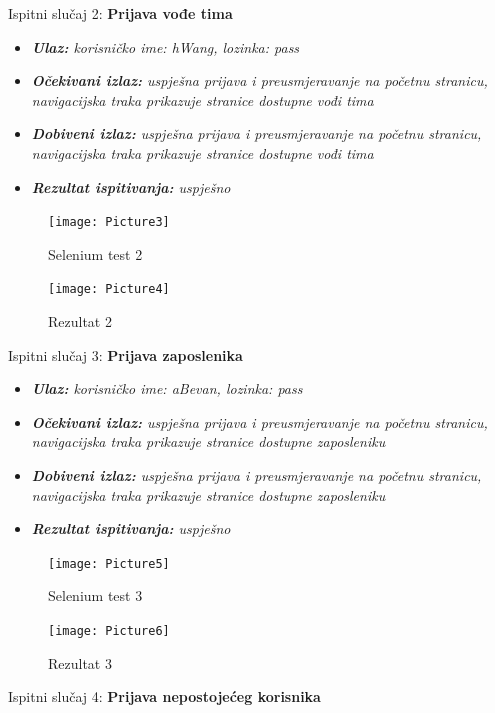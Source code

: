 Ispitni slučaj 2: \textbf{Prijava vođe tima} 


\begin{itemize}
 	\item \textit{ \textbf{Ulaz: }korisničko ime: hWang, lozinka: pass }
 	\item \textit{\textbf{Očekivani izlaz: }uspješna prijava i preusmjeravanje na početnu stranicu, navigacijska traka prikazuje stranice dostupne vođi tima }
 	\item \textit{\textbf{Dobiveni izlaz: }uspješna prijava i preusmjeravanje na početnu stranicu, navigacijska traka prikazuje stranice dostupne vođi tima }
 	\item \textit{\textbf{Rezultat ispitivanja: }uspješno}
 \end{itemize}
                \begin{figure}[H] 					\centering 					                \texttt{[image: Picture3]}
				\caption{Selenium test 2}
				\end{figure}
			    \begin{figure}[H] 					\centering 					\texttt{[image: Picture4]}
				\caption{Rezultat 2}
				\end{figure}
  
Ispitni slučaj 3: \textbf{Prijava zaposlenika } 


\begin{itemize}
 	\item \textit{ \textbf{Ulaz: }korisničko ime: aBevan, lozinka: pass}
 	\item \textit{\textbf{Očekivani izlaz: }uspješna prijava i preusmjeravanje na početnu stranicu, navigacijska traka prikazuje stranice dostupne zaposleniku}
 	\item \textit{\textbf{Dobiveni izlaz: }uspješna prijava i preusmjeravanje na početnu stranicu, navigacijska traka prikazuje stranice dostupne zaposleniku }
 	\item \textit{\textbf{Rezultat ispitivanja: }uspješno}
 \end{itemize}
                \begin{figure}[H] 					\centering 					                \texttt{[image: Picture5]}
				\caption{Selenium test 3}
				\end{figure}
			    \begin{figure}[H] 					\centering 					\texttt{[image: Picture6]}
				\caption{Rezultat 3}
				\end{figure}
\eject

Ispitni slučaj 4: \textbf{Prijava nepostojećeg korisnika} 


